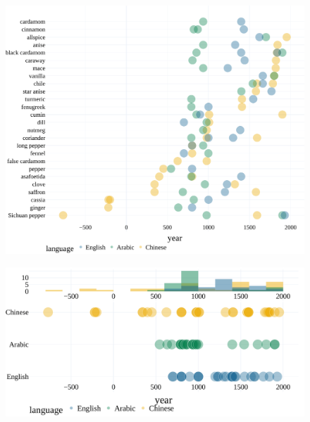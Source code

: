 \begin{figure}[!ht]
  \centering
  \includegraphics[width=\linewidth]{imgs/plots/attestation.pdf}
  \caption{}
  \label{fig:attestation}
\end{figure}

\begin{figure}[!ht]
  \centering
  \includegraphics[width=\linewidth]{imgs/plots/attestation_compact.pdf}
  \caption{}
  \label{fig:attestation_compact}
\end{figure}



















